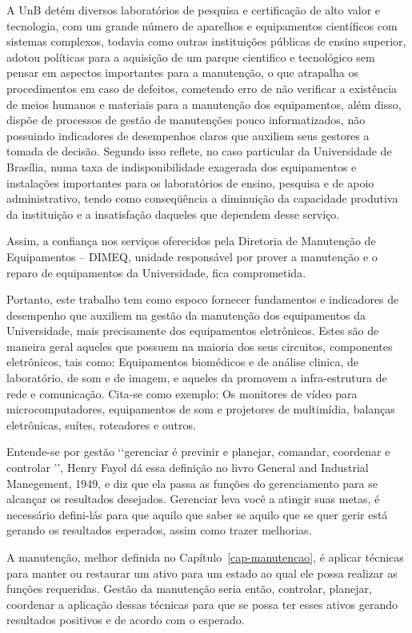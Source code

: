 A UnB detém diversos laboratórios de pesquisa e certificação de alto valor e tecnologia, com um grande número de aparelhos e equipamentos científicos com sistemas complexos, todavia como outras instituições públicas de ensino superior, adotou políticas para a aquisição de um parque cientifico e tecnológico sem pensar em aspectos importantes para a manutenção, o que atrapalha os procedimentos em caso de defeitos, cometendo erro de não verificar a existência de meios humanos e materiais para a manutenção dos equipamentos, além disso, dispõe de processos de gestão de manutenções pouco informatizados, não possuindo indicadores de desempenhos claros que auxiliem seus gestores a tomada de decisão. Segundo \cite{limacastilho2006} isso reflete, no caso particular da Universidade de Brasília, numa taxa de indisponibilidade exagerada dos equipamentos e instalações importantes para os laboratórios de ensino, pesquisa e de apoio administrativo, tendo como conseqüência a diminuição da capacidade produtiva da instituição e a insatisfação daqueles que dependem desse serviço.

Assim, a confiança nos serviços oferecidos pela Diretoria de Manutenção de Equipamentos – DIMEQ, unidade responsável por prover a manutenção e o reparo de equipamentos da Universidade, fica comprometida. 

Portanto, este trabalho tem como espoco fornecer fundamentos e indicadores de desempenho que auxiliem na gestão da manutenção dos equipamentos da Universidade, mais precisamente dos equipamentos eletrônicos. Estes são de maneira geral aqueles que possuem na maioria dos seus circuitos, componentes eletrônicos, tais como: Equipamentos biomédicos e de análise clinica, de laboratório, de som e de imagem, e aqueles da promovem a infra-estrutura de rede e comunicação. Cita-se como exemplo: Os monitores de vídeo para microcomputadores, equipamentos de som e projetores de multimídia, balanças eletrônicas, suítes, roteadores e outros.

Entende-se por gestão \lq\lq gerenciar é previnir e planejar, comandar, coordenar e controlar \rq\rq, Henry Fayol dá essa definição no livro General and Industrial Manegement, 1949, e \cite{prasadgulshan2011} diz que ela passa as funções do gerenciamento para se alcançar os resultados desejados. Gerenciar leva você a atingir suas metas, é necessário defini-lás para que aquilo que saber se aquilo que se quer gerir está gerando os resultados esperados, assim como trazer melhorias.

A manutenção, melhor definida no Capítulo~\ref{cap-manutencao}, é aplicar técnicas para manter ou restaurar um ativo para um estado ao qual ele possa realizar as funções requeridas. Gestão da manutenção seria então, controlar, planejar, coordenar a aplicação dessas técnicas para que se possa ter esses ativos gerando resultados positivos e de acordo com o esperado.

